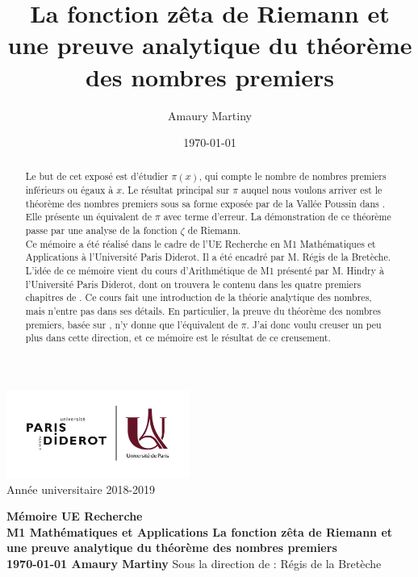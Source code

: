 \documentclass[french]{report}
\title{La fonction zêta de Riemann et une preuve analytique du théorème des nombres premiers}
\author{Amaury Martiny}
\date{\today}
\begin{document}
\begin{titlepage}
  \centering
  \includegraphics[width=6cm]{paris_diderot_logo.jpg}\\
  Année universitaire 2018-2019

  \vfill
  {\bfseries
    Mémoire UE Recherche\\
    M1 Mathématiques et Applications
    \vskip1cm
    \Large La fonction zêta de Riemann et une preuve analytique du théorème des nombres premiers\\
    \vskip1cm
    \normalsize \today
    \vskip1cm
    Amaury Martiny
  }    
  \vfill
  \vfill
  Sous la direction de :\hskip1cm Régis de la Bretèche
\end{titlepage}

\begin{abstract}
  Le but de cet exposé est d'étudier $\pi(x)$, qui compte le nombre de nombres premiers inférieurs ou égaux à $x$. Le résultat principal sur $\pi$ auquel nous voulons arriver est le théorème des nombres premiers sous sa forme exposée par de la Vallée Poussin dans \cite{valleepoussin}. Elle présente un équivalent de $\pi$ avec terme d'erreur. La démonstration de ce théorème passe par une analyse de la fonction $\zeta$ de Riemann.
  \\

  Ce mémoire a été réalisé dans le cadre de l'UE Recherche en M1 Mathématiques et Applications à l'Université Paris Diderot. Il a été encadré par M. Régis de la Bretèche.
  \\

  L'idée de ce mémoire vient du cours d'Arithmétique de M1 présenté par M. Hindry à l'Université Paris Diderot, dont on trouvera le contenu dans les quatre premiers chapitres de \cite{hindry}. Ce cours fait une introduction de la théorie analytique des nombres, mais n'entre pas dans ses détails. En particulier, la preuve du théorème des nombres premiers, basée sur \cite{donzagier}, n'y donne que l'équivalent de $\pi$. J'ai donc voulu creuser un peu plus dans cette direction, et ce mémoire est le résultat de ce creusement.
\end{abstract}

\tableofcontents{}
\end{document}
